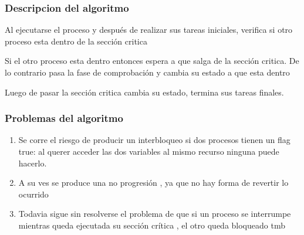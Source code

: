 \documentclass{beamer}
\begin{document}
\begin{frame}

\frametitle{Descripcion del algoritmo}
Al ejecutarse el proceso y después de realizar sus tareas iniciales, verifica si otro proceso esta dentro de la sección critica 
\par Si el otro proceso esta dentro entonces espera a que salga de la sección critica. De lo contrario pasa la fase de comprobación y cambia su estado a que esta dentro 
\par Luego de pasar la sección critica cambia su estado, termina sus tareas finales.


\end{frame}

\begin{frame}

\frametitle{Problemas del algoritmo}
\begin{enumerate}[$*$]
\item Se corre el riesgo de producir un interbloqueo si dos procesos tienen un flag true: al querer acceder las dos variables al mismo recurso ninguna puede hacerlo.
\item    A su ves se produce una no progresión , ya que no hay forma de revertir lo ocurrido
\item  Todavia sigue sin resolverse el problema de que si un proceso se interrumpe mientras queda ejecutada su sección crítica , el otro queda bloqueado tmb
\end{enumerate}

\end{frame}
\end{document}

